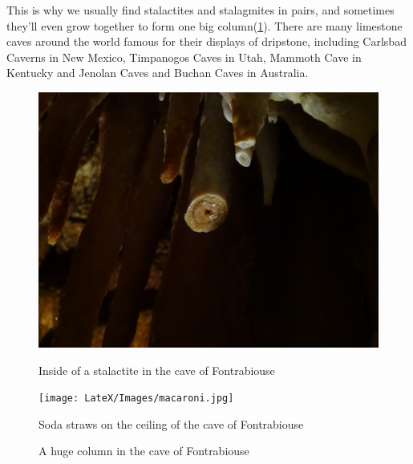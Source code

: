 \documentclass[draft, final]{report}
\begin{document}
This is why we usually find stalactites and stalagmites in pairs, and sometimes they'll even grow together to form one big column(\ref{column}). There are many limestone caves around the world famous for their displays of dripstone, including Carlsbad Caverns in New Mexico, Timpanogos Caves in Utah, Mammoth Cave in Kentucky and Jenolan Caves and Buchan Caves in Australia.\\
  \begin{figure}[!ht]
      \begin{minipage}[c]{0.50\linewidth}
        \includegraphics[scale=0.22]{LateX/Images/stalagmitesolubilization.jpg}
        \caption{Inside of a stalactite in the cave of Fontrabiouse}
      \end{minipage}\hfill%
    \begin{minipage}[c]{0.50\linewidth}
      \texttt{[image: LateX/Images/macaroni.jpg]}
      \caption{Soda straws on the ceiling of the cave of Fontrabiouse}
    \end{minipage}
\end{figure}
\begin{figure}[!ht]
  \centering
  \caption{A huge column in the cave of Fontrabiouse\label{column}}
\end{figure}
\end{document}
